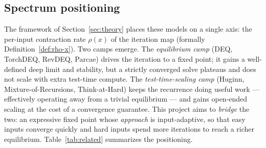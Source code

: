 \documentclass[11pt]{article}
\begin{document}
\subsection{Spectrum positioning}
\label{sec:positioning}

The framework of Section~\ref{sec:theory} places these models on a single axis: the
per-input contraction rate $\rho(x)$ of the iteration map (formally
Definition~\ref{def:rho-x}).  Two camps emerge.  The \emph{equilibrium camp}
(DEQ, TorchDEQ, RevDEQ, Parcae) drives the iteration to a fixed point; it gains a
well-defined deep limit and stability, but a strictly converged solve plateaus and
does not scale with extra test-time compute.  The \emph{test-time-scaling camp}
(Huginn, Mixture-of-Recursions, Think-at-Hard) keeps the recurrence doing useful
work --- effectively operating away from a trivial equilibrium --- and gains
open-ended scaling at the cost of a convergence guarantee.  This project aims to
\emph{bridge} the two: an expressive fixed point whose \emph{approach} is
input-adaptive, so that easy inputs converge quickly and hard inputs spend more
iterations to reach a richer equilibrium.  Table~\ref{tab:related} summarizes the
positioning.
\end{document}
